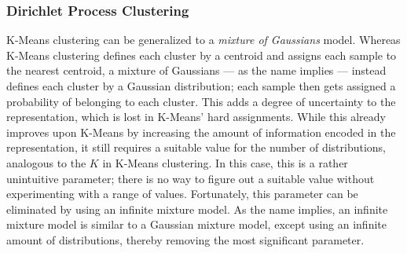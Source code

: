 \subsubsection{Dirichlet Process Clustering}
K-Means clustering can be generalized to a \emph{mixture of Gaussians} model.
Whereas K-Means clustering defines each cluster by a centroid and assigns each
sample to the nearest centroid, a mixture of Gaussians --- as the name implies
--- instead defines each cluster by a Gaussian distribution; each sample then
gets assigned a probability of belonging to each cluster. This adds a degree
of uncertainty to the representation, which is lost in K-Means' hard
assignments. While this already improves upon K-Means by increasing the amount
of information encoded in the representation, it still requires a suitable
value for the number of distributions, analogous to the $K$ in K-Means
clustering. In this case, this is a rather unintuitive parameter; there is no
way to figure out a suitable value without experimenting with a range of
values. Fortunately, this parameter can be eliminated by using an infinite
mixture model. As the name implies, an infinite mixture model is similar to a
Gaussian mixture model, except using an infinite amount of distributions,
thereby removing the most significant parameter.

